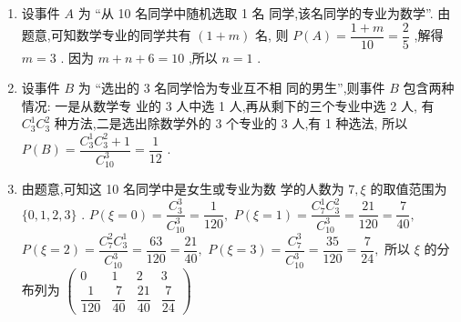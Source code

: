 \begin{enumerate}
\begin{jieda}
    \begin{enumerate}
        \item 设事件 $A$ 为 “从 10 名同学中随机选取 1 名
同学,该名同学的专业为数学”.
由题意,可知数学专业的同学共有 $\left( {1 + m}\right)$ 名,
则 $P\left( A\right)  = \dfrac{1 + m}{10} = \dfrac{2}{5}$ ,解得 $m = 3$ .
因为 $m + n + 6 = {10}$ ,所以 $n = 1$ .
        \item 设事件 $B$ 为 “选出的 3 名同学恰为专业互不相
同的男生”,则事件 $B$ 包含两种情况: 一是从数学专
业的 3 人中选 1 人,再从剩下的三个专业中选 2 人,
有 ${{C}}_{3}^{1}{{C}}_{3}^{2}$ 种方法,二是选出除数学外的 3 个专业的 3
人,有 1 种选法,
所以 $P\left( B\right)  = \dfrac{{{C}}_{3}^{1}{{C}}_{3}^{2} + 1}{{{C}}_{10}^{3}} = \dfrac{1}{12}$ .

\item 由题意,可知这 10 名同学中是女生或专业为数
学的人数为 $7,\xi$ 的取值范围为 $\{ 0,1,2,3\}$ .
$P\left( {\xi  = 0}\right)  = \dfrac{{{C}}_{3}^{3}}{{{C}}_{10}^{3}} = \dfrac{1}{120},$
$P\left( {\xi  = 1}\right)  = \dfrac{{{C}}_{7}^{1}{{C}}_{3}^{2}}{{{C}}_{10}^{3}} = \dfrac{21}{120} = \dfrac{7}{40},$
$P\left( {\xi  = 2}\right)  = \dfrac{{{C}}_{7}^{2}{{C}}_{3}^{1}}{{{C}}_{10}^{3}} = \dfrac{63}{120} = \dfrac{21}{40},$
$P\left( {\xi  = 3}\right)  = \dfrac{{{C}}_{7}^{3}}{{{C}}_{10}^{3}} = \dfrac{35}{120} = \dfrac{7}{24},$
所以 $\xi$ 的分布列为
$\begin{pmatrix}
    0 &1& 2& 3 \\
    \dfrac{1}{120} & \dfrac{7}{40} & \dfrac{21}{40} & \dfrac{7}{24}
\end{pmatrix}$

    \end{enumerate}

\end{jieda}

\end{enumerate}





\clearpage
